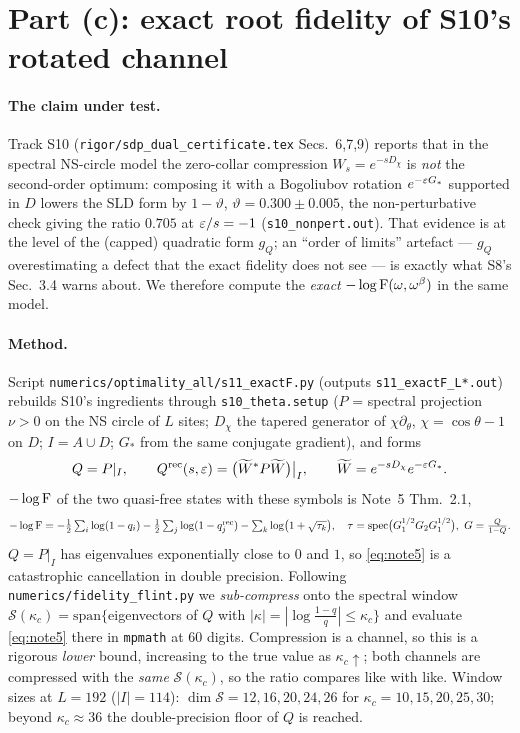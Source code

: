 \documentclass[11pt]{article}
\DeclareMathOperator{\spec}{spec}
\begin{document}
\section{Part (c): exact root fidelity of S10's rotated channel}
\label{sec:s10}

\paragraph{The claim under test.}  Track S10 (\texttt{rigor/sdp\_dual\_certificate.tex}
Secs.~6,7,9) reports that in the spectral NS-circle model the zero-collar compression
$W_s=e^{-sD_\chi}$ is \emph{not} the second-order optimum: composing it with a Bogoliubov
rotation $e^{-\varepsilon G_*}$ supported in $D$ lowers the SLD form by $1-\vartheta$,
$\vartheta=0.300\pm0.005$, the non-perturbative check giving the ratio $0.705$ at $\varepsilon/s=-1$
(\texttt{s10\_nonpert.out}).  That evidence is at the level of the (capped) quadratic form
$g_Q$; an ``order of limits'' artefact --- $g_Q$ overestimating a defect that the exact fidelity
does not see --- is exactly what S8's Sec.~3.4 warns about.  We therefore compute the
\emph{exact} $-\log\operatorname{F}(\omega,\omega^\beta)$ in the same model.

\paragraph{Method.}  Script \texttt{numerics/optimality\_all/s11\_exactF.py} (outputs
\texttt{s11\_exactF\_L*.out}) rebuilds S10's ingredients through \texttt{s10\_theta.setup}
($P$ = spectral projection $\nu>0$ on the NS circle of $L$ sites; $D_\chi$ the tapered generator
of $\chi\partial_\theta$, $\chi=\cos\theta-1$ on $D$; $I=A\cup D$; $G_*$ from the same conjugate
gradient), and forms
\[
 Q=P|_I,\qquad Q^{\rm rec}(s,\varepsilon)=\bigl(\widetilde W^*P\widetilde W\bigr)\big|_I,\qquad
 \widetilde W=e^{-sD_\chi}e^{-\varepsilon G_*}.
\]
$-\log\operatorname{F}$ of the two quasi-free states with these symbols is Note~5 Thm.~2.1,
\begin{equation}\label{eq:note5}
 -\log\Fid=-\tfrac12\textstyle\sum_i\log(1-q_i)-\tfrac12\sum_j\log(1-q^{\rm rec}_j)
 -\sum_k\log\bigl(1+\sqrt{\tau_k}\bigr),\quad
 \tau=\spec\bigl(G_1^{1/2}G_2G_1^{1/2}\bigr),\ G=\tfrac{Q}{1-Q} .
\end{equation}
$Q=P|_I$ has eigenvalues exponentially close to $0$ and $1$, so \eqref{eq:note5} is a
catastrophic cancellation in double precision.  Following \texttt{numerics/fidelity\_flint.py} we
\emph{sub-compress} onto the spectral window
$\mathcal S(\kappa_c)=\mathrm{span}\{$eigenvectors of $Q$ with $|\kappa|=|\log\frac{1-q}{q}|\le\kappa_c\}$
and evaluate \eqref{eq:note5} there in \texttt{mpmath} at $60$ digits.  Compression is a channel,
so this is a rigorous \emph{lower} bound, increasing to the true value as $\kappa_c\uparrow$; both
channels are compressed with the \emph{same} $\mathcal S(\kappa_c)$, so the ratio compares like
with like.  Window sizes at $L=192$ ($|I|=114$): $\dim\mathcal S=12,16,20,24,26$ for
$\kappa_c=10,15,20,25,30$; beyond $\kappa_c\approx36$ the double-precision floor of $Q$ is reached.
\end{document}
